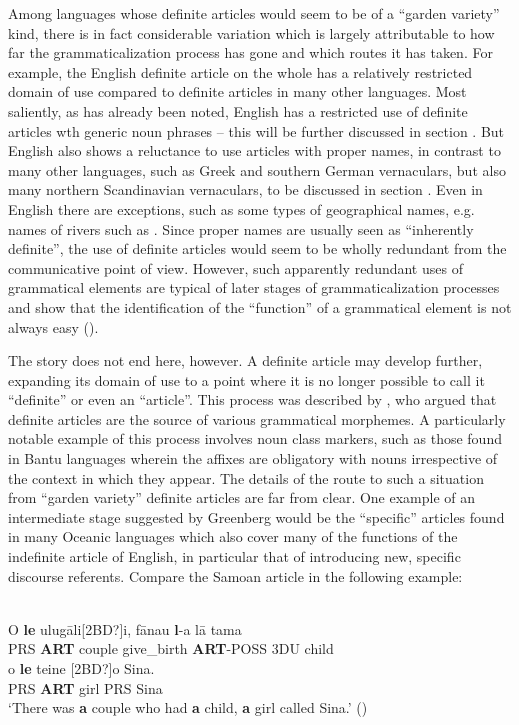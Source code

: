 Among languages whose definite articles would seem to be of a “garden variety” kind, there is in fact considerable variation which is largely attributable to how far the grammaticalization process has gone and which routes it has taken. For example, the English definite article on the whole has a relatively restricted domain of use compared to definite articles in many other languages. Most saliently, as has already been noted, English has a restricted use of definite articles wth generic noun phrases – this will be further discussed in section . But English also shows a reluctance to use articles with proper names, in contrast to many other languages, such as Greek and southern German vernaculars, but also many northern Scandinavian vernaculars, to be discussed in section . Even in English there are exceptions, such as some types of geographical names, e.g. names of rivers such as . Since proper names are usually seen as “inherently definite”, the use of definite articles would seem to be wholly redundant from the communicative point of view. However, such apparently redundant uses of grammatical elements are typical of later stages of grammaticalization processes and show that the identification of the “function” of a grammatical element is not always easy (\citet[81-86]{Dahl2004}).

The story does not end here, however. A definite article may develop further, expanding its domain of use to a point where it is no longer possible to call it “definite” or even an “article”. This process was described by \citet{Greenberg1978}, who argued that definite articles are the source of various grammatical morphemes.  A particularly notable example of this process involves noun class markers, such  as those found in Bantu languages wherein the affixes are obligatory with nouns irrespective of the context in which they appear. The details of the route to such a situation from “garden variety” definite articles are far from clear. One example of an intermediate stage suggested by Greenberg would be the “specific” articles found in many Oceanic languages which also cover many of the functions of the indefinite article of English, in particular that of introducing new, specific discourse referents. Compare the Samoan article  in the following example: 

\ea\label{}
\\
\gll	[2BD?]O  \textbf{le} ulug\=ali[2BD?]i,  f\=anau  \textbf{l}{}-a  l\=a  tama\\
		PRS  \textbf{ART} couple  give\_birth  \textbf{ART}{}-POSS  3DU  child\\
\gll	[2BD?]o  \textbf{le} teine  [2BD?]o  Sina.\\
		PRS  \textbf{ART} girl  PRS  Sina\\
\glt ‘There was \textbf{a} couple who had \textbf{a} child, \textbf{a} girl called Sina.’ (\citet[259]{HovdhaugenEtAl1992})

